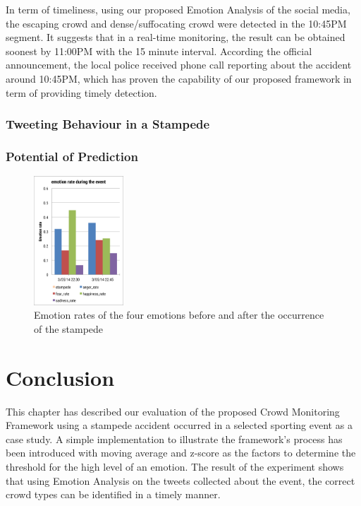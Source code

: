In term of timeliness, using our proposed Emotion Analysis of the social media, the escaping crowd and dense/suffocating crowd were detected in the 10:45PM segment. It suggests that in a real-time monitoring, the result can be obtained soonest by 11:00PM with the 15 minute interval. According the official announcement, the local police received phone call reporting about the accident around 10:45PM, which has proven the capability of our proposed framework in term of providing timely detection.

\subsubsection{Tweeting Behaviour in a Stampede}

\subsubsection{Potential of Prediction}

\begin{figure}[htb!]
\centering
\includegraphics[width=0.3\textwidth]{EmotionRatePrediction}
\caption{Emotion rates of the four emotions before and after the occurrence of the stampede}
\label{fig:emotionRatePrediction}
\end{figure}

\section{Conclusion}
This chapter has described our evaluation of the proposed Crowd Monitoring Framework using a stampede accident occurred in a selected sporting event as a case study. A simple implementation to illustrate the framework's process has been introduced with moving average and z-score as the factors to determine the threshold for the high level of an emotion. The result of the experiment shows that using Emotion Analysis on the tweets collected about the event, the correct crowd types can be identified in a timely manner.